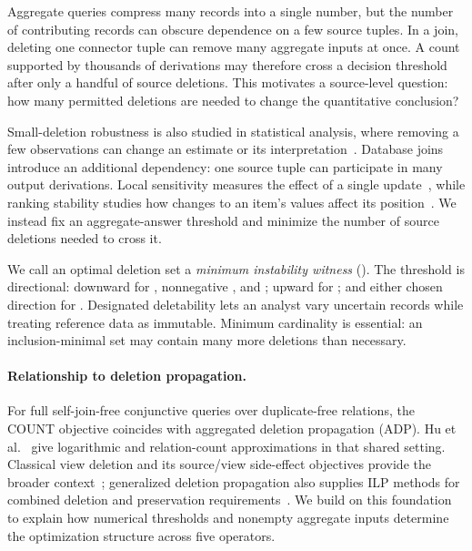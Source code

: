 Aggregate queries compress many records into a single number, but the
number of contributing records can obscure dependence on a few source
tuples. In a join, deleting one connector tuple can remove many aggregate
inputs at once. A count supported by thousands of derivations may therefore
cross a decision threshold after only a handful of source deletions.
This motivates a source-level question: how many permitted deletions are
needed to change the quantitative conclusion?

Small-deletion robustness is also studied in statistical analysis, where
removing a few observations can change an estimate or its
interpretation~\cite{broderick2020dropping,huang2025dropping}. Database
joins introduce an additional dependency: one source tuple can participate
in many output derivations. Local sensitivity measures the effect of a
single update~\cite{tao2020sensitivity}, while ranking stability studies
how changes to an item's values affect its
position~\cite{campbellLocalStability}. We instead fix an aggregate-answer
threshold and minimize the number of source deletions needed to cross it.

We call an optimal deletion set a \emph{minimum instability witness}
(\MIW). The threshold is directional: downward for ,
nonnegative , and ; upward for ; and either
chosen direction for . Designated deletability lets an analyst
vary uncertain records while treating reference data as immutable.
Minimum cardinality is essential: an inclusion-minimal set may contain
many more deletions than necessary.

\paragraph{Relationship to deletion propagation.}
For full self-join-free conjunctive queries over duplicate-free relations,
the COUNT objective coincides with aggregated deletion propagation (ADP).
Hu et al.~\cite{hu2021adp} give logarithmic and relation-count
approximations in that shared setting. Classical view deletion and its
source/view side-effect objectives provide the broader
context~\cite{buneman2002deletion,kimelfeld2011deletion}; generalized
deletion propagation also supplies ILP methods for combined deletion and
preservation requirements~\cite{makhija2025ilp}. We build on this foundation
to explain how numerical thresholds and nonempty aggregate inputs determine
the optimization structure across five operators.

